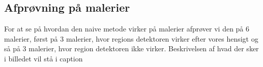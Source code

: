 \begin{figure}[!h]
    \centering
		\hspace{1em}
	    \hspace{1em}
\end{figure}

\clearpage

\subsection{Afprøvning på malerier}
For at se på hvordan den naive metode virker på malerier afprøver vi den
på 6 malerier, først på 3 malerier, hvor regions detektoren virker
efter vores hensigt og så på 3 malerier, hvor region detektoren ikke
virker. Beskrivelsen af hvad der sker i billedet vil stå i caption


